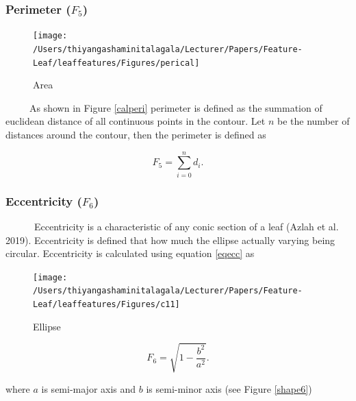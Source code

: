 \documentclass{article}
\begin{document}
\hypertarget{perimeter-f_5}{%
\subsubsection{\texorpdfstring{Perimeter
(\(F_5\))}{Perimeter (F\_5)}}\label{perimeter-f_5}}

\begin{figure}[!ht]

{\centering \texttt{[image: /Users/thiyangashaminitalagala/Lecturer/Papers/Feature-Leaf/leaffeatures/Figures/perical]} 

}

\caption{\label{calperi}Area}\label{fig:unnamed-chunk-17}
\end{figure}

~~~~~As shown in Figure \ref{calperi} perimeter is defined as the
summation of euclidean distance of all continuous points in the contour.
Let \(n\) be the number of distances around the contour, then the
perimeter is defined as

\begin{equation}
   F_5 =  \sum_{i=0}^{n}d_i.
\label{equa_F5}
\end{equation}

\hypertarget{eccentricity-f_6}{%
\subsubsection{\texorpdfstring{Eccentricity
(\(F_6\))}{Eccentricity (F\_6)}}\label{eccentricity-f_6}}

~~~~~~Eccentricity is a characteristic of any conic section of a leaf
(Azlah et al. 2019). Eccentricity is defined that how much the ellipse
actually varying being circular. Eccentricity is calculated using
equation \ref{eqecc} as

\begin{figure}[!ht]

{\centering \texttt{[image: /Users/thiyangashaminitalagala/Lecturer/Papers/Feature-Leaf/leaffeatures/Figures/c11]} 

}

\caption{\label{shape6}Ellipse}\label{fig:unnamed-chunk-18}
\end{figure}

\begin{equation}
    F_6 = \sqrt{1-\frac{b^2}{a^2}}.
    \label{eqecc}
\end{equation}

where \(a\) is semi-major axis and \(b\) is semi-minor axis (see Figure
\ref{shape6})
\end{document}
